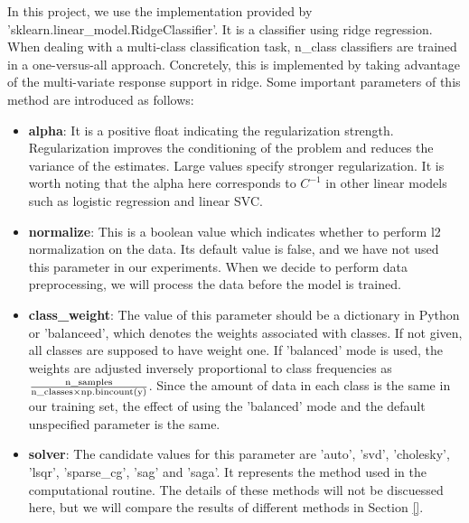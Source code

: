 \documentclass[10pt,journal,compsoc]{IEEEtran}
\begin{document}
In this project, we use the implementation provided by 'sklearn.linear\_model.RidgeClassifier'. It is a classifier using ridge regression. When dealing with a multi-class classification task, n\_class classifiers are trained in a one-versus-all approach. Concretely, this is implemented by taking advantage of the multi-variate response support in ridge. Some important parameters of this method are introduced as follows:
\begin{itemize}
  \item \textbf{alpha}: It is a positive float indicating the regularization strength. Regularization improves the conditioning of the problem and reduces the variance of the estimates. Large values specify stronger regularization. It is worth noting that the alpha here corresponds to $C^{-1}$ in other linear models such as logistic regression and linear SVC.
  \item \textbf{normalize}: This is a boolean value which indicates whether to perform l2 normalization on the data. Its default value is false, and we have not used this parameter in our experiments. When we decide to perform data preprocessing, we will process the data before the model is trained.
  \item \textbf{class\_weight}: The value of this parameter should be a dictionary in Python or 'balanceed', which denotes the weights associated with classes. If not given, all classes are supposed to have weight one. If 'balanced' mode is used, the weights are adjusted inversely proportional to class frequencies as $\frac{\rm n\_samples}{\rm n\_classes \times np.bincount(y)}$. Since the amount of data in each class is the same in our training set, the effect of using the 'balanced' mode and the default unspecified parameter is the same.
  \item \textbf{solver}: The candidate values for this parameter are 'auto', 'svd', 'cholesky', 'lsqr', 'sparse\_cg', 'sag' and 'saga'. It represents the method used in the computational routine. The details of these methods will not be discuessed here, but we will compare the results of different methods in Section \ref{}.%
\end{itemize}
\end{document}
